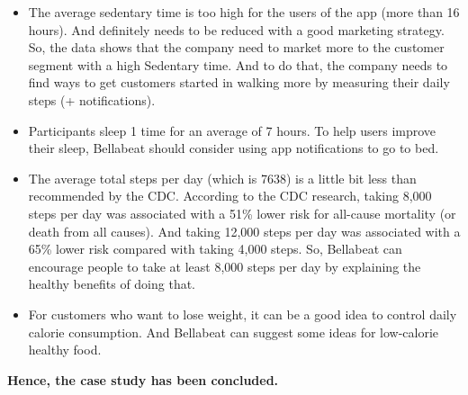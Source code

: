 \documentclass[
]{article}
\begin{document}
\begin{itemize}
\item
  The average sedentary time is too high for the users of the app (more
  than 16 hours). And definitely needs to be reduced with a good
  marketing strategy. So, the data shows that the company need to market
  more to the customer segment with a high Sedentary time. And to do
  that, the company needs to find ways to get customers started in
  walking more by measuring their daily steps (+ notifications).
\item
  Participants sleep 1 time for an average of 7 hours. To help users
  improve their sleep, Bellabeat should consider using app notifications
  to go to bed.
\item
  The average total steps per day (which is 7638) is a little bit less
  than recommended by the CDC. According to the CDC research, taking
  8,000 steps per day was associated with a 51\% lower risk for
  all-cause mortality (or death from all causes). And taking 12,000
  steps per day was associated with a 65\% lower risk compared with
  taking 4,000 steps. So, Bellabeat can encourage people to take at
  least 8,000 steps per day by explaining the healthy benefits of doing
  that.
\item
  For customers who want to lose weight, it can be a good idea to
  control daily calorie consumption. And Bellabeat can suggest some
  ideas for low-calorie healthy food.
\end{itemize}

\textbf{Hence, the case study has been concluded.}
\end{document}

